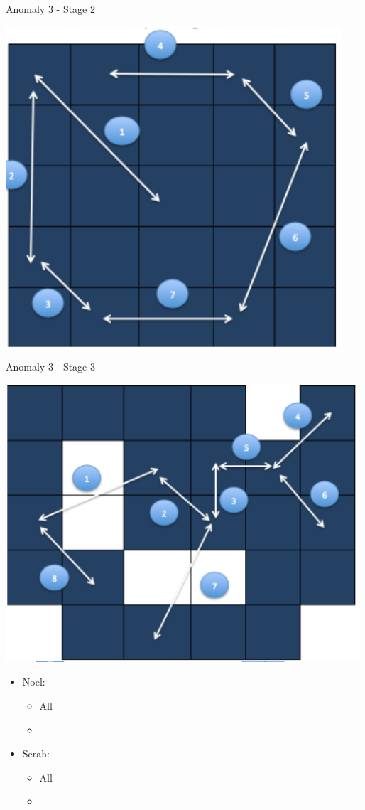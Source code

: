 Anomaly 3 - Stage 2

\includegraphics{Images/anomaly3stage2}

Anomaly 3 - Stage 3

\includegraphics{images/anomaly3stage3}

\begin{menu}
	\begin{itemize}
		\crystarium
		\begin{itemize}
			\item Noel:
			      \begin{itemize}
				      \item All \rav
				      \item \stagebonus{\rav}
			      \end{itemize}
			\item Serah:
			      \begin{itemize}
				      \item All \rav
				      \item {}
			      \end{itemize}
		\end{itemize}
	\end{itemize}
\end{menu}


